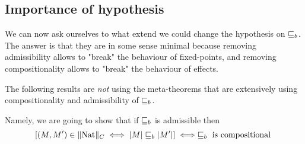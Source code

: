 \subsection{Importance of hypothesis}

We can now ask ourselves to what extend we could change 
the hypothesis on $\sqsubseteq_b$. The answer is that they 
are in some sense minimal because removing admissibility 
allows to "break" the behaviour of fixed-points, and 
removing compositionality allows to "break" the 
behaviour of effects.

The following results are \emph{not} using the meta-theorems 
that are extensively using compositionality and admissibility 
of $\sqsubseteq_b$.

\begin{lemma}
    Namely, we are going to show that if $\sqsubseteq_b$ is admissible then 
    \begin{equation*}
        \left[(M,M') \in \| \textnormal{Nat} \|_C \iff
        |M| \sqsubseteq_b |M'| \right]
        \iff
        \sqsubseteq_b \text{ is compositional }
    \end{equation*}
\end{lemma}

